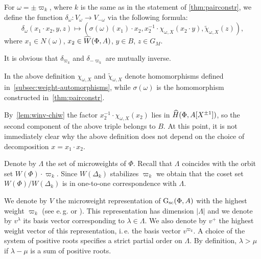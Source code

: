 \begin{dfn} \label{sigma-def}
  For $\omega = \pm \varpi_k$, where $k$ is the same as in the statement of \cref{thm:pairconstr},
  we define the function $\delta_\omega \colon V_\omega \to V_{-\omega}$ via the following formula:
  \begin{equation} \label{eq:sigma-def} \delta_\omega(x_1 \cdot x_2, y, z) \mapsto (\sigma(\omega)(x_1)\cdot x_2, x_2^{-1} \cdot \chi_{\omega, X}(x_2 \cdot y), \widetilde{\chi}_{\omega, X}(z)), \end{equation}
  where $x_1 \in N(\omega)$, $x_2 \in \widehat{W}(\Phi, A)$,  $y \in B$, $z \in G_M$.
\end{dfn}

It is obvious that $\delta_{\varpi_k}$ and $\delta_{-\varpi_k}$ are mutually inverse.

In the above definition $\chi_{\omega, X}$ and $\widetilde{\chi}_{\omega, X}$ denote homomorphisms defined in~\cref{subsec:weight-automorphisms},
 while $\sigma(\omega)$ is the homomorphism constructed in~\cref{thm:pairconstr}.

By~\cref{lem:winv-chiw} the factor $x_2^{-1} \cdot \chi_{\omega, X}(x_2)$ lies in $\widehat{H}(\Phi, A[X^{\pm 1}])$,
 so the second component of the above triple belongs to $B$.
At this point, it is not immediately clear why the above definition does not depend on the choice of decomposition $x = x_1 \cdot x_2$.

Denote by $\Lambda$ the set of microweights of $\Phi$.
Recall that $\Lambda$ coincides with the orbit set $W(\Phi) \cdot \varpi_k$.
Since $W(\Delta_k)$ stabilizes $\varpi_k$ we obtain that the coset set $W(\Phi)/W(\Delta_k)$ is in one-to-one correspondence with $\Lambda$.

We denote by $V$ the microweight representation of $\operatorname{G}_\mathrm{sc}(\Phi, A)$ with the highest weight $\varpi_k$ (see e.\,g. \cite[\S~2]{Ge17} or \cite[\S~1.1]{V00}).
This representation has dimension $|\Lambda|$ and we denote by $v^\lambda$ its basis vector corresponding to $\lambda \in \Lambda$.
We also denote by $v^+$ the highest weight vector of this representation, i.\,e. the basis vector $v^{\varpi_k}$.
A choice of the system of positive roots specifies a strict partial order on $\Lambda$.
By definition, $\lambda > \mu$ if $\lambda - \mu$ is a sum of positive roots.

